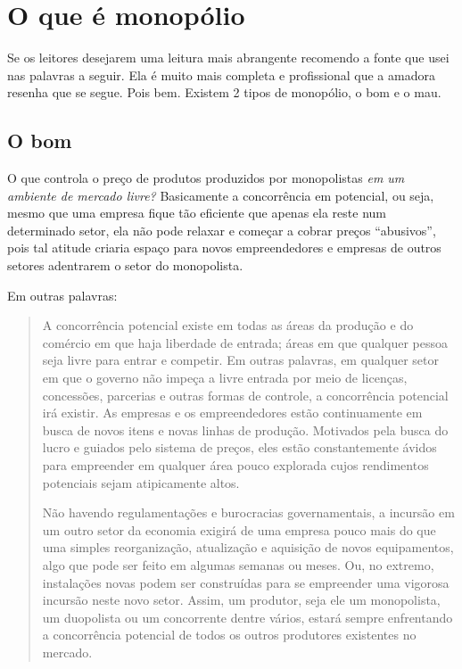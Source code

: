 \section{O que é monopólio}

Se os leitores desejarem uma leitura mais abrangente recomendo a fonte
que usei nas palavras a seguir.\cite{monopoly-bad-good} Ela é muito
mais completa e profissional que a amadora resenha que se segue. Pois
bem. Existem 2 tipos de monopólio, o bom e o mau.

\subsection{O bom}

O que controla o preço de produtos produzidos por monopolistas
\emph{em um ambiente de mercado livre?} Basicamente a concorrência em
potencial, ou seja, mesmo que uma empresa fique tão eficiente que
apenas ela reste num determinado setor, ela não pode relaxar e começar
a cobrar preços ``abusivos'', pois tal atitude criaria espaço para
novos empreendedores e empresas de outros setores adentrarem o setor
do monopolista.

Em outras palavras:

\begin{quote}
  A concorrência potencial existe em todas as áreas da produção e do
  comércio em que haja liberdade de entrada; áreas em que qualquer
  pessoa seja livre para entrar e competir.  Em outras palavras, em
  qualquer setor em que o governo não impeça a livre entrada por meio de
  licenças, concessões, parcerias e outras formas de controle, a
  concorrência potencial irá existir.  As empresas e os empreendedores
  estão continuamente em busca de novos itens e novas linhas de
  produção.  Motivados pela busca do lucro e guiados pelo sistema de
  preços, eles estão constantemente ávidos para empreender em qualquer
  área pouco explorada cujos rendimentos potenciais sejam atipicamente
  altos.

  Não havendo regulamentações e burocracias governamentais, a incursão
  em um outro setor da economia exigirá de uma empresa pouco mais do que
  uma simples reorganização, atualização e aquisição de novos
  equipamentos, algo que pode ser feito em algumas semanas ou meses.
  Ou, no extremo, instalações novas podem ser construídas para se
  empreender uma vigorosa incursão neste novo setor.  Assim, um
  produtor, seja ele um monopolista, um duopolista ou um concorrente
  dentre vários, estará sempre enfrentando a concorrência potencial de
  todos os outros produtores existentes no mercado.
  \cite{monopoly-bad-good}
\end{quote}

